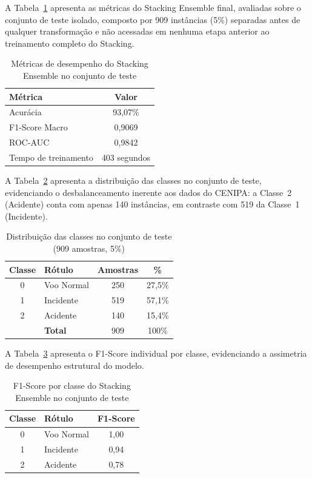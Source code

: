 \documentclass[english,brazilian]{UNISINOSartigo}
\begin{document}
A Tabela~\ref{tab:metricas} apresenta as métricas do Stacking Ensemble final,
avaliadas sobre o conjunto de teste isolado, composto por 909 instâncias (5\%)
separadas antes de qualquer transformação e não acessadas em nenhuma etapa
anterior ao treinamento completo do Stacking.

\begin{table}[ht]
  \caption{Métricas de desempenho do Stacking Ensemble no conjunto de teste}
  \label{tab:metricas}
  \centering
  \begin{tabular}{lc}
    \toprule
    \textbf{Métrica} & \textbf{Valor} \\
    \midrule
    Acurácia              & 93,07\%   \\
    F1-Score Macro        & 0,9069    \\
    ROC-AUC               & 0,9842    \\
    Tempo de treinamento  & 403 segundos \\
    \bottomrule
  \end{tabular}
\end{table}

A Tabela~\ref{tab:distribuicao} apresenta a distribuição das classes no conjunto de
teste, evidenciando o desbalanceamento inerente aos dados do CENIPA: a Classe~2
(Acidente) conta com apenas 140 instâncias, em contraste com 519 da
Classe~1 (Incidente).

\begin{table}[ht]
  \caption{Distribuição das classes no conjunto de teste (909 amostras, 5\%)}
  \label{tab:distribuicao}
  \centering
  \begin{tabular}{clcc}
    \toprule
    \textbf{Classe} & \textbf{Rótulo} & \textbf{Amostras} & \textbf{\%} \\
    \midrule
    0 & Voo Normal  & 250 & 27,5\% \\
    1 & Incidente   & 519 & 57,1\% \\
    2 & Acidente    & 140 & 15,4\% \\
    \midrule
      & \textbf{Total} & 909 & 100\%  \\
    \bottomrule
  \end{tabular}
\end{table}

A Tabela~\ref{tab:classes} apresenta o F1-Score individual por classe, evidenciando a
assimetria de desempenho estrutural do modelo.

\begin{table}[ht]
  \caption{F1-Score por classe do Stacking Ensemble no conjunto de teste}
  \label{tab:classes}
  \centering
  \begin{tabular}{clc}
    \toprule
    \textbf{Classe} & \textbf{Rótulo} & \textbf{F1-Score} \\
    \midrule
    0 & Voo Normal  & 1,00 \\
    1 & Incidente   & 0,94 \\
    2 & Acidente    & 0,78 \\
    \bottomrule
  \end{tabular}
\end{table}
\end{document}
